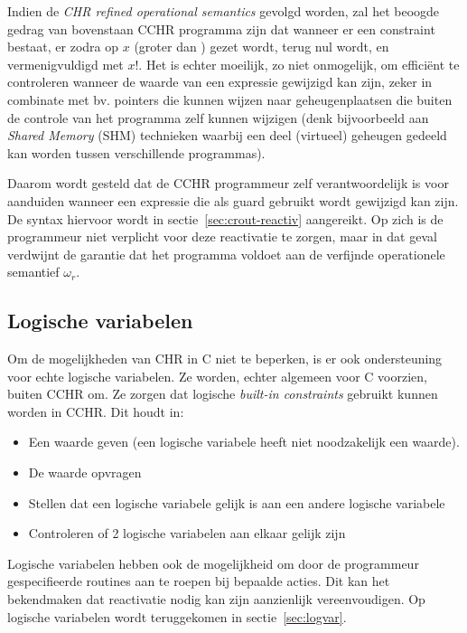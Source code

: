 Indien de {\em CHR refined operational semantics} gevolgd worden, zal het beoogde gedrag van bovenstaan CCHR programma zijn dat wanneer er een  constraint bestaat, er zodra  op $x$ (groter dan ) gezet wordt,  terug nul wordt, en  vermenigvuldigd met $x!$. Het is echter moeilijk, zo niet onmogelijk, om effici\"ent te controleren wanneer de waarde van een expressie gewijzigd kan zijn, zeker in combinate met bv. pointers die kunnen wijzen naar geheugenplaatsen die buiten de controle van het programma zelf kunnen wijzigen (denk bijvoorbeeld aan {\em Shared Memory} (SHM) technieken waarbij een deel (virtueel) geheugen gedeeld kan worden tussen verschillende programmas).

Daarom wordt gesteld dat de CCHR programmeur zelf verantwoordelijk is voor aanduiden wanneer een expressie die als guard gebruikt wordt gewijzigd kan zijn. De syntax hiervoor wordt in sectie~\ref{sec:crout-reactiv} aangereikt. Op zich is de programmeur niet verplicht voor deze reactivatie te zorgen, maar in dat geval verdwijnt de garantie dat het programma voldoet aan de verfijnde operationele semantief $\omega_r$.

\subsection{Logische variabelen}

Om de mogelijkheden van CHR in C niet te beperken, is er ook ondersteuning voor echte logische variabelen. Ze worden, echter algemeen voor C voorzien, buiten CCHR om. Ze zorgen dat logische {\em built-in constraints} gebruikt kunnen worden in CCHR. Dit houdt in: \begin{itemize}
  \item Een waarde geven (een logische variabele heeft niet noodzakelijk een waarde).
  \item De waarde opvragen
  \item Stellen dat een logische variabele gelijk is aan een andere logische variabele
  \item Controleren of 2 logische variabelen aan elkaar gelijk zijn
\end{itemize}

Logische variabelen hebben ook de mogelijkheid om door de programmeur gespecifieerde routines aan te roepen bij bepaalde acties. Dit kan het bekendmaken dat reactivatie nodig kan zijn aanzienlijk vereenvoudigen. Op logische variabelen wordt teruggekomen in sectie~\ref{sec:logvar}.


